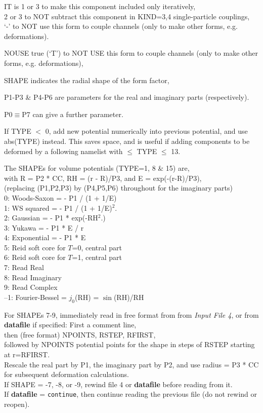 \documentclass[11pt]{article}
\begin{document}
\noindent
IT is 1 or 3 to make this component included only iteratively,\\
 \hspace*{8mm} 2 or 3 to NOT subtract this component in KIND=3,4 single-particle  couplings, \\
 \hspace*{8mm} `-'  to NOT use this form to couple channels (only  to make other forms, e.g. deformations).

\noindent
NOUSE true (`T') to NOT USE this form to couple channels (only  to make other forms, e.g. deformations),

\noindent
SHAPE indicates the radial shape of the form factor,

\noindent
P1-P3 \& P4-P6  are parameters for the real and imaginary parts (respectively).

\noindent
P0$\equiv$P7 can give a further parameter.

\medskip

If TYPE $<$ 0, add new potential numerically into previous potential,
and use abs(TYPE) instead.   This saves space, and is useful if adding
 components to be deformed by a following namelist with $\leq$ TYPE $\leq$ 13.


\bigskip

The SHAPEs for volume potentials (TYPE=1, 8 \& 15) are,
\\
with R = P2 * CC, RH = (r - R)/P3, and E = exp(-(r-R)/P3),
\\
(replacing (P1,P2,P3) by (P4,P5,P6) throughout for the imaginary parts)\\
%
   0: Woods-Saxon  = - P1 / (1 + 1/E)
\\ 1: WS squared   = - P1 / (1 + 1/E)$^2$.
\\ 2: Gaussian     = - P1 * exp(-RH$^2$.)
\\ 3: Yukawa       = - P1 * E / r
\\ 4: Exponential  = - P1 * E
\\ 5: Reid soft core for $T$=0, central part
\\ 6: Reid soft core for $T$=1, central part
\\ 7: Read Real
\\ 8: Read Imaginary
\\ 9: Read Complex
\\--1: Fourier-Bessel = $j_0$(RH) = $\sin$(RH)/RH


For SHAPEs 7-9, immediately read in free format from from {\em Input File 4}, or from {\bf datafile} if specified:
First a comment line,\\
then (free format) NPOINTS, RSTEP, RFIRST, \\
followed by NPOINTS potential points for the shape in steps of RSTEP starting at r=RFIRST.
\\
Rescale the real part by P1, the imaginary part by P2,
and use radius = P3 * CC for subsequent deformation calculations.
\\
If SHAPE = -7, -8, or -9, rewind file 4 or {\bf datafile} before reading from it.\\
If {\bf datafile} = {\tt continue}, then continue reading the previous file (do not rewind or reopen).\\
\bigskip
\end{document}
